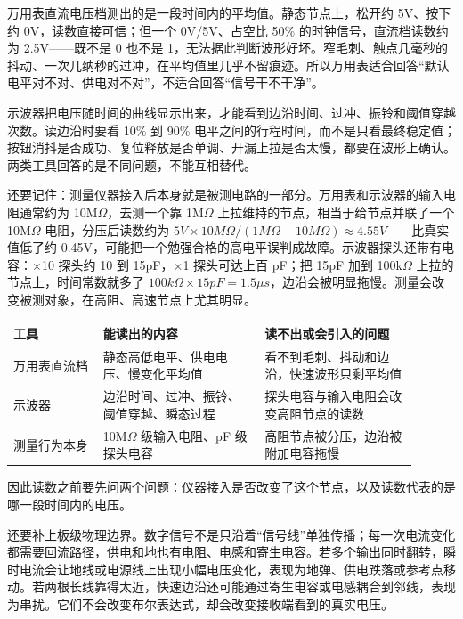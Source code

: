 万用表直流电压档测出的是一段时间内的平均值。静态节点上，松开约 5V、按下约 0V，读数直接可信；但一个 0V/5V、占空比 50\% 的时钟信号，直流档读数约为 2.5V——既不是 0 也不是 1，无法据此判断波形好坏。窄毛刺、触点几毫秒的抖动、一次几纳秒的过冲，在平均值里几乎不留痕迹。所以万用表适合回答“默认电平对不对、供电对不对”，不适合回答“信号干不干净”。

示波器把电压随时间的曲线显示出来，才能看到边沿时间、过冲、振铃和阈值穿越次数。读边沿时要看 10\% 到 90\% 电平之间的行程时间，而不是只看最终稳定值；按钮消抖是否成功、复位释放是否单调、开漏上拉是否太慢，都要在波形上确认。两类工具回答的是不同问题，不能互相替代。

还要记住：测量仪器接入后本身就是被测电路的一部分。万用表和示波器的输入电阻通常约为 10M$\Omega$，去测一个靠 1M$\Omega$ 上拉维持的节点，相当于给节点并联了一个 10M$\Omega$ 电阻，分压后读数约为 $5V \times 10M\Omega/(1M\Omega+10M\Omega) \approx 4.55V$——比真实值低了约 0.45V，可能把一个勉强合格的高电平误判成故障。示波器探头还带有电容：$\times$10 探头约 10 到 15pF，$\times$1 探头可达上百 pF；把 15pF 加到 100k$\Omega$ 上拉的节点上，时间常数就多了 $100k\Omega \times 15pF = 1.5\mu s$，边沿会被明显拖慢。测量会改变被测对象，在高阻、高速节点上尤其明显。

\begin{longtable}{L{0.2\linewidth}L{0.36\linewidth}L{0.34\linewidth}}
\toprule
工具 & 能读出的内容 & 读不出或会引入的问题 \\
\midrule
万用表直流档 & 静态高低电平、供电电压、慢变化平均值 & 看不到毛刺、抖动和边沿，快速波形只剩平均值 \\\tablerowrule
示波器 & 边沿时间、过冲、振铃、阈值穿越、瞬态过程 & 探头电容与输入电阻会改变高阻节点的读数 \\\tablerowrule
测量行为本身 & 10M$\Omega$ 级输入电阻、pF 级探头电容 & 高阻节点被分压，边沿被附加电容拖慢 \\
\bottomrule
\end{longtable}

因此读数之前要先问两个问题：仪器接入是否改变了这个节点，以及读数代表的是哪一段时间内的电压。

还要补上板级物理边界。数字信号不是只沿着“信号线”单独传播；每一次电流变化都需要回流路径，供电和地也有电阻、电感和寄生电容。若多个输出同时翻转，瞬时电流会让地线或电源线上出现小幅电压变化，表现为地弹、供电跌落或参考点移动。若两根长线靠得太近，快速边沿还可能通过寄生电容或电感耦合到邻线，表现为串扰。它们不会改变布尔表达式，却会改变接收端看到的真实电压。

